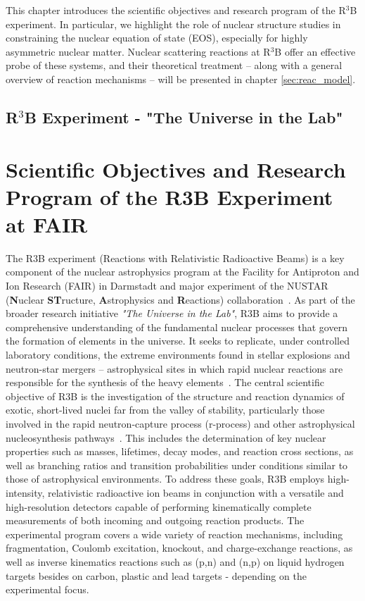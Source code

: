 This chapter introduces the scientific objectives and research program of the R$^3$B experiment. In particular, we highlight the role of nuclear structure studies in constraining the nuclear equation of state (EOS), especially for highly asymmetric nuclear matter. Nuclear scattering reactions at R$^3$B offer an effective probe of these systems, and their theoretical treatment -- along with a general overview of reaction mechanisms -- will be presented in chapter \ref{sec:reac_model}.

\subsection{R$^3$B Experiment - "The Universe in the Lab"}
\section{Scientific Objectives and Research Program of the R3B Experiment at FAIR}
The R3B experiment (Reactions with Relativistic Radioactive Beams) is a key component of the nuclear astrophysics program at the Facility for Antiproton and Ion Research (FAIR) in Darmstadt and major experiment of the NUSTAR (\textbf{N}uclear \textbf{ST}ructure, \textbf{A}strophysics and \textbf{R}eactions) collaboration~\cite{krucken2005nustar}.\newline
As part of the broader research initiative \textit{"The Universe in the Lab"}, R3B aims to provide a comprehensive understanding of the fundamental nuclear processes that govern the formation of elements in the universe. It seeks to replicate, under controlled laboratory conditions, the extreme environments found in stellar explosions and neutron-star mergers -- astrophysical sites in which rapid nuclear reactions are responsible for the synthesis of the heavy elements~\cite{thielemann2017neutron}.\newline
The central scientific objective of R3B is the investigation of the structure and reaction dynamics of exotic, short-lived nuclei far from the valley of stability, particularly those involved in the rapid neutron-capture process (r-process) and other astrophysical nucleosynthesis pathways~\cite{horowitz2019r}. This includes the determination of key nuclear properties such as masses, lifetimes, decay modes, and reaction cross sections, as well as branching ratios and transition probabilities under conditions similar to those of astrophysical environments.\newline
To address these goals, R3B employs high-intensity, relativistic radioactive ion beams in conjunction with a versatile and high-resolution detectors capable of performing kinematically complete measurements of both incoming and outgoing reaction products. The experimental program covers a wide variety of reaction mechanisms, including fragmentation, Coulomb excitation, knockout, and charge-exchange reactions, as well as inverse kinematics reactions such as (p,n) and (n,p) on liquid hydrogen targets besides on carbon, plastic and lead targets - depending on the experimental focus.\newline
